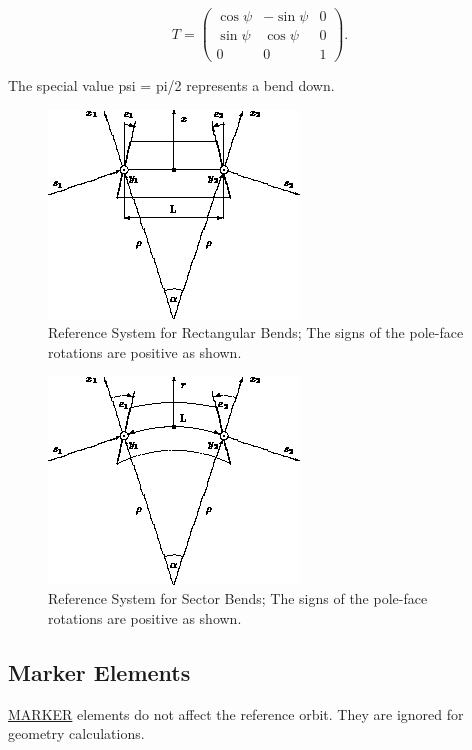 \[
T =
 \begin{pmatrix}
  \cos \psi &  -\sin \psi & 0 \\
  \sin \psi &  \cos \psi  & 0 \\
  0	    &	0	  & 1 
 \end{pmatrix}
.
\]

The special value psi = pi/2 represents a bend down.  

\begin{figure}[H]
  \centering
	\includegraphics{figures/ref_rbend.png}
  \caption{Reference System for Rectangular Bends; The signs of the pole-face rotations are positive as shown.}
\end{figure}

\begin{figure}[H]
  \centering
	\includegraphics{figures/ref_sbend.png}
  \caption{Reference System for Sector Bends; The signs of the pole-face rotations are positive as shown. }
\end{figure}


\subsection{Marker Elements}
\href{marker.html}{MARKER} elements do not  affect the reference orbit. 
They are ignored for geometry calculations.  

